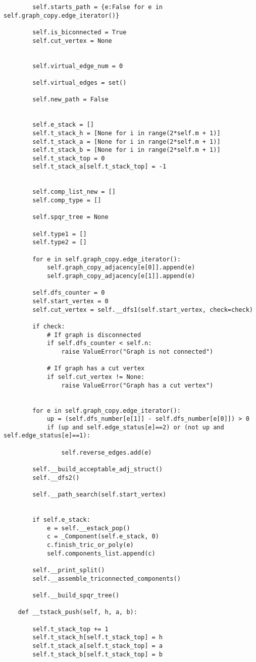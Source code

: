 \begin{center}
\begin{verbatim}
		self.starts_path = {e:False for e in self.graph_copy.edge_iterator()}

		self.is_biconnected = True
		self.cut_vertex = None


		self.virtual_edge_num = 0

		self.virtual_edges = set()

		self.new_path = False


		self.e_stack = []
		self.t_stack_h = [None for i in range(2*self.m + 1)]
		self.t_stack_a = [None for i in range(2*self.m + 1)]
		self.t_stack_b = [None for i in range(2*self.m + 1)]
		self.t_stack_top = 0
		self.t_stack_a[self.t_stack_top] = -1


		self.comp_list_new = []
		self.comp_type = []

		self.spqr_tree = None

		self.type1 = []
		self.type2 = []

		for e in self.graph_copy.edge_iterator():
			self.graph_copy_adjacency[e[0]].append(e)
			self.graph_copy_adjacency[e[1]].append(e)

		self.dfs_counter = 0
		self.start_vertex = 0
		self.cut_vertex = self.__dfs1(self.start_vertex, check=check)

		if check:
			# If graph is disconnected
			if self.dfs_counter < self.n:
				raise ValueError("Graph is not connected")

			# If graph has a cut vertex
			if self.cut_vertex != None:
				raise ValueError("Graph has a cut vertex")


		for e in self.graph_copy.edge_iterator():
			up = (self.dfs_number[e[1]] - self.dfs_number[e[0]]) > 0
			if (up and self.edge_status[e]==2) or (not up and self.edge_status[e]==1):

				self.reverse_edges.add(e)

		self.__build_acceptable_adj_struct()
		self.__dfs2()

		self.__path_search(self.start_vertex)


		if self.e_stack:
			e = self.__estack_pop()
			c = _Component(self.e_stack, 0)
			c.finish_tric_or_poly(e)
			self.components_list.append(c)

		self.__print_split()
		self.__assemble_triconnected_components()

		self.__build_spqr_tree()

	def __tstack_push(self, h, a, b):

		self.t_stack_top += 1
		self.t_stack_h[self.t_stack_top] = h
		self.t_stack_a[self.t_stack_top] = a
		self.t_stack_b[self.t_stack_top] = b


\end{verbatim}
\end{center}
